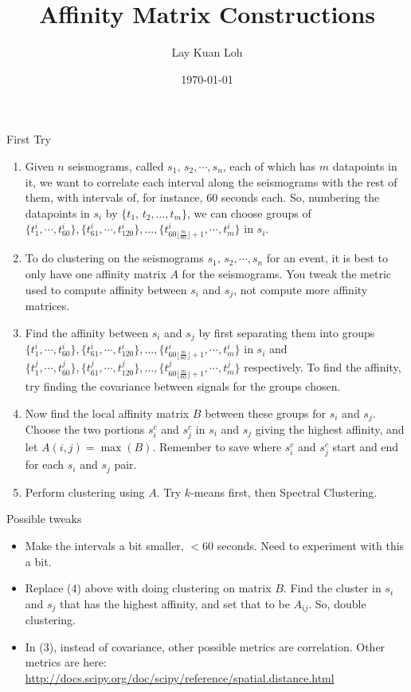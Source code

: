 \documentclass[letterpaper,12pt]{article}
\begin{document}
\title{Affinity Matrix Constructions}
\author{Lay Kuan Loh}
\date{\today}
\maketitle


First Try
\begin{enumerate}
    \item Given $n$ seismograms, called $s_1,\,s_2,\cdots,s_n$, each of which has $m$ datapoints in it, we want to correlate each interval along the seismograms with the rest of them, with intervals of, for instance, 60 seconds each. So, numbering the datapoints in $s_i$ by $\{t_1,\,t_2,\ldots,t_m\}$, we can choose groups of $\{t^i_1,\cdots,t^i_{60}\},\{t^i_{61},\cdots,t^i_{120}\},\ldots,\{t^i_{60\lfloor\frac{m}{60}\rfloor+ 1},\cdots,t^i_m\}$ in $s_i$. 

    \item To do clustering on the seismograms $s_1,\,s_2,\cdots,s_n$ for an event, it is best to only have one affinity matrix $A$ for the seismograms. You tweak the metric used to compute affinity between $s_i$ and $s_j$, not compute more affinity matrices. 

    \item Find the affinity between $s_i$ and $s_j$ by first separating them into groups $\{t^i_1,\cdots,t^i_{60}\},\{t^i_{61},\cdots,t^i_{120}\},\ldots,\{t^i_{60\lfloor\frac{m}{60}\rfloor+ 1},\cdots,t^i_m\}$ in $s_i$ and $\{t^j_1,\cdots,t^j_{60}\},\{t^j_{61},\cdots,t^j_{120}\},\ldots,\{t^j_{60\lfloor\frac{m}{60}\rfloor+ 1},\cdots,t^j_m\}$ respectively. To find the affinity, try finding the covariance between signals for the groups chosen. 

    \item Now find the local affinity matrix $B$ between these groups for $s_i$ and $s_j$. Choose the two portions $s_i^c$ and $s_j^c$ in $s_i$ and $s_j$ giving the highest affinity, and let $A(i,j) = \max(B)$. Remember to save where $s_i^c$ and $s_j^c$ start and end for each $s_i$ and $s_j$ pair. 

    \item Perform clustering using $A$. Try $k$-means first, then Spectral Clustering.
\end{enumerate}

Possible tweaks
\begin{itemize}
    \item Make the intervals a bit smaller, $<60$ seconds. Need to experiment with this a bit.
    \item Replace (4) above with doing clustering on matrix $B$. Find the cluster in $s_i$ and $s_j$ that has the highest affinity, and set that to be $A_{ij}$. So, double clustering. 
    \item In (3), instead of covariance, other possible metrics are correlation. Other metrics are here: \url{http://docs.scipy.org/doc/scipy/reference/spatial.distance.html}
\end{itemize}
\end{document}
